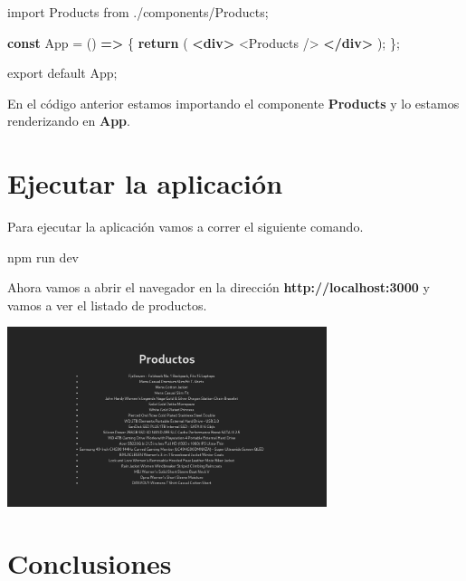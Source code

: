 \documentclass[
  a4paper,
  DIV=11,
  numbers=noendperiod,
  onepage,
  openany]{scrreprt}
\newenvironment{Shaded}{\begin{snugshade}}{\end{snugshade}}
\newcommand{\ControlFlowTok}[1]{\textcolor[rgb]{0.00,0.23,0.31}{\textbf{#1}}}
\newcommand{\ExtensionTok}[1]{\textcolor[rgb]{0.00,0.23,0.31}{#1}}
\newcommand{\FunctionTok}[1]{\textcolor[rgb]{0.28,0.35,0.67}{#1}}
\newcommand{\ImportTok}[1]{\textcolor[rgb]{0.00,0.46,0.62}{#1}}
\newcommand{\KeywordTok}[1]{\textcolor[rgb]{0.00,0.23,0.31}{\textbf{#1}}}
\newcommand{\NormalTok}[1]{\textcolor[rgb]{0.00,0.23,0.31}{#1}}
\newcommand{\OperatorTok}[1]{\textcolor[rgb]{0.37,0.37,0.37}{#1}}
\newcommand{\StringTok}[1]{\textcolor[rgb]{0.13,0.47,0.30}{#1}}
\begin{document}
\begin{tcolorbox}
\begin{Shaded}
\begin{Highlighting}[]
\ImportTok{import}\NormalTok{ Products }\ImportTok{from} \StringTok{\textquotesingle{}./components/Products\textquotesingle{}}\OperatorTok{;}

\KeywordTok{const}\NormalTok{ App }\OperatorTok{=}\NormalTok{ () }\KeywordTok{=\textgreater{}}\NormalTok{ \{}
  \ControlFlowTok{return}\NormalTok{ (}
    \KeywordTok{\textless{}div\textgreater{}}
      \FunctionTok{\textless{}Products} \FunctionTok{/\textgreater{}}
    \KeywordTok{\textless{}/div\textgreater{}}
\NormalTok{  )}\OperatorTok{;}
\NormalTok{\}}\OperatorTok{;}

\ImportTok{export} \ImportTok{default}\NormalTok{ App}\OperatorTok{;}
\end{Highlighting}
\end{Shaded}

En el código anterior estamos importando el componente \textbf{Products}
y lo estamos renderizando en \textbf{App}.

\section{Ejecutar la aplicación}\label{ejecutar-la-aplicaciuxf3n-2}

Para ejecutar la aplicación vamos a correr el siguiente comando.

\begin{Shaded}
\begin{Highlighting}[]
\ExtensionTok{npm}\NormalTok{ run dev}
\end{Highlighting}
\end{Shaded}

Ahora vamos a abrir el navegador en la dirección
\textbf{http://localhost:3000} y vamos a ver el listado de productos.

\includegraphics[width=0.7\textwidth,height=\textheight]{unidades/unidad6/images/paste-2.png}

\section{Conclusiones}\label{conclusiones-8}


\end{tcolorbox}
\end{document}
